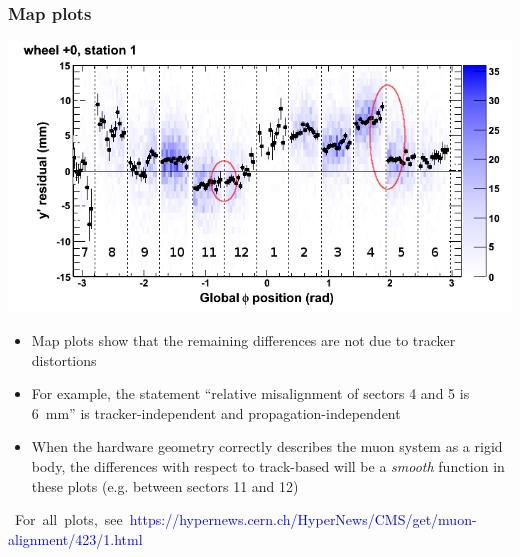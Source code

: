 \documentclass[compress]{beamer}
\begin{document}
\begin{frame}
\frametitle{Map plots}

\vspace{-0.25 cm}
\begin{center}
\includegraphics[width=0.8\linewidth]{DTvsphi_st1whC_y.png}
\end{center}

\vspace{-0.5 cm}
\begin{itemize}
\item Map plots show that the remaining differences are not due to tracker distortions
\item For example, the statement ``relative misalignment of sectors 4 and 5 is 6~mm'' is tracker-independent and propagation-independent
\item When the hardware geometry correctly describes the muon system as a rigid body, the differences with respect to track-based will be a {\it smooth} function in these plots (e.g. between sectors 11 and 12)
\end{itemize}

\mbox{\hspace{-0.5 cm} \scriptsize For all plots, see \textcolor{blue}{https://hypernews.cern.ch/HyperNews/CMS/get/muon-alignment/423/1.html}\hspace{-1 cm}}
\end{frame}
\end{document}
